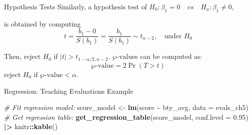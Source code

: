 \documentclass[
  ignorenonframetext,
]{beamer}
\newenvironment{Shaded}{\begin{snugshade}}{\end{snugshade}}
\newcommand{\AttributeTok}[1]{\textcolor[rgb]{0.13,0.29,0.53}{#1}}
\newcommand{\CommentTok}[1]{\textcolor[rgb]{0.56,0.35,0.01}{\textit{#1}}}
\newcommand{\FloatTok}[1]{\textcolor[rgb]{0.00,0.00,0.81}{#1}}
\newcommand{\FunctionTok}[1]{\textcolor[rgb]{0.13,0.29,0.53}{\textbf{#1}}}
\newcommand{\NormalTok}[1]{#1}
\newcommand{\OtherTok}[1]{\textcolor[rgb]{0.56,0.35,0.01}{#1}}
\newcommand{\SpecialCharTok}[1]{\textcolor[rgb]{0.81,0.36,0.00}{\textbf{#1}}}
\begin{document}
\begin{frame}{Hypothesis Tests}
\protect{}\label{hypothesis-tests-1}
Similarly, a hypothesis test of
\(H_0: \beta_1=0\quad vs \quad H_a: \beta_1\neq0\),

is obtained by computing
\[ t=\frac{b_1-0}{S(b_1)}=\frac{b_1}{S(b_1)}\sim t_{n-2}, \quad \text{under } H_0\]

Then, reject \(H_0\) if \(|t|>t_{1-\alpha/2, n-2}\).
\(\wp\text{-value}\)s can be computed as: \[\wp\text{-value}=2\Pr(T>t)\]
reject \(H_0\) if \(\wp\text{-value}<\alpha\).
\end{frame}

\begin{frame}[fragile]{Regression: Teaching Evaluations Example}
\protect{}\label{regression-teaching-evaluations-example-7}
\small

\begin{Shaded}
\begin{Highlighting}[]
\CommentTok{\# Fit regression model:}
\NormalTok{score\_model }\OtherTok{\textless{}{-}} \FunctionTok{lm}\NormalTok{(score }\SpecialCharTok{\textasciitilde{}}\NormalTok{ bty\_avg, }\AttributeTok{data =}\NormalTok{ evals\_ch5)}
\CommentTok{\# Get regression table:}
\FunctionTok{get\_regression\_table}\NormalTok{(score\_model, }\AttributeTok{conf.level =} \FloatTok{0.95}\NormalTok{) }\SpecialCharTok{|\textgreater{}} 
\NormalTok{  knitr}\SpecialCharTok{::}\FunctionTok{kable}\NormalTok{()}
\end{Highlighting}
\end{Shaded}


\end{frame}
\end{document}
